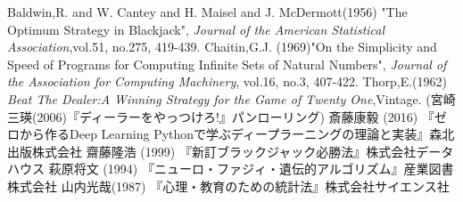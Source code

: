 \begin{thebibliography}{9}
   Baldwin,R. and W. Cantey and H. Maisel and J. McDermott(1956) "The Optimum Strategy in Blackjack", {\it{Journal of the American Statistical Association}},vol.51, no.275, 419-439.
   Chaitin,G.J. (1969)"On the Simplicity and Speed of Programs for Computing Infinite Sets of Natural Numbers", {\it{Journal of the Association for Computing Machinery}}, vol.16, no.3, 407-422.
   Thorp,E.(1962) {\it{Beat The Dealer:A Winning Strategy for the Game of Twenty One}},Vintage. (宮崎三瑛(2006)『ディーラーをやっつけろ!』パンローリング)
   斎藤康毅 (2016) 『ゼロから作るDeep Learning Pythonで学ぶディープラーニングの理論と実装』森北出版株式会社
   齋藤隆浩 (1999) 『新訂ブラックジャック必勝法』株式会社データハウス
   萩原将文 (1994) 『ニューロ・ファジィ・遺伝的アルゴリズム』産業図書株式会社
   山内光哉(1987) 『心理・教育のための統計法』株式会社サイエンス社
\end{thebibliography}
